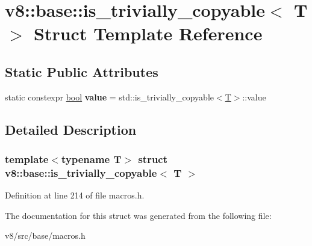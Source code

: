 \hypertarget{structv8_1_1base_1_1is__trivially__copyable}{}\section{v8\+:\+:base\+:\+:is\+\_\+trivially\+\_\+copyable$<$ T $>$ Struct Template Reference}
\label{structv8_1_1base_1_1is__trivially__copyable}
\subsection*{Static Public Attributes}
\begin{DoxyCompactItemize}
\item 
\mbox{\label{structv8_1_1base_1_1is__trivially__copyable_ab0844a6dc237d0646bacf76de123da96}} 
static constexpr \mbox{\hyperlink{classbool}{bool}} {\bfseries value} = std\+::is\+\_\+trivially\+\_\+copyable$<$\mbox{\hyperlink{classv8_1_1internal_1_1torque_1_1T}{T}}$>$\+::value
\end{DoxyCompactItemize}


\subsection{Detailed Description}
\subsubsection*{template$<$typename T$>$\newline
struct v8\+::base\+::is\+\_\+trivially\+\_\+copyable$<$ T $>$}



Definition at line 214 of file macros.\+h.



The documentation for this struct was generated from the following file\+:\begin{DoxyCompactItemize}
\item 
v8/src/base/macros.\+h\end{DoxyCompactItemize}
